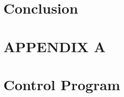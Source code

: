 \documentclass{article}
\begin{document}
\section{Conclusion}
\label{sec:conclusion}




 \newpage
\onecolumn
\appendix
\setcounter{table}{0}
\setcounter{figure}{0}
\setcounter{subsection}{0}
\makeatletter \renewcommand{\thefigure}{A.\@arabic\c@figure} \renewcommand{\thetable}{A.\@arabic\c@table} \renewcommand{\thesection}{A.\@arabic\c@section} \makeatother
\section*{APPENDIX A}

\section{Control Program}
%
 
\end{document}
